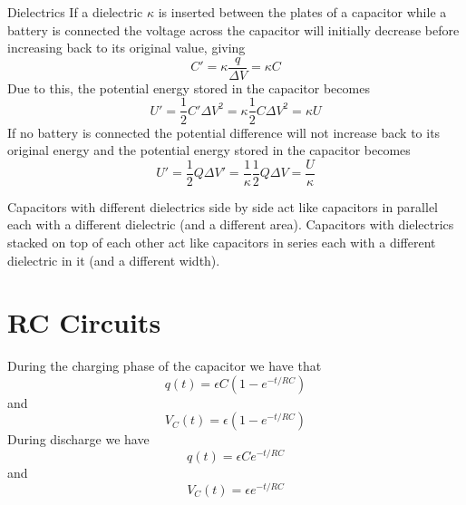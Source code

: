 \documentclass[12pt]{report}
\begin{document}
\begin{defn}{Dielectrics}{}
        If a dielectric $\kappa$ is inserted between the plates of a capacitor while a battery is connected the voltage across the capacitor will initially decrease before increasing back to its original value, giving \begin{equation}
                C' = \kappa \frac{q}{\Delta V} = \kappa C
        \end{equation}
        Due to this, the potential energy stored in the capacitor becomes \begin{equation}
                U' = \frac{1}{2}C'\Delta V^2 = \kappa \frac{1}{2}C\Delta V^2 = \kappa U
        \end{equation}
        If no battery is connected the potential difference will not increase back to its original energy and the potential energy stored in the capacitor becomes \begin{equation}
                U' = \frac{1}{2}Q\Delta V' = \frac{1}{\kappa} \frac{1}{2}Q\Delta V = \frac{U}{\kappa}
        \end{equation}
\end{defn}


\begin{rmk}{}{}
        Capacitors with different dielectrics side by side act like capacitors in parallel each with a different dielectric (and a different area). Capacitors with dielectrics stacked on top of each other act like capacitors in series each with a different dielectric in it (and a different width).
\end{rmk}


\section{RC Circuits}


\begin{defn}{}{}
        During the charging phase of the capacitor we have that \begin{equation}
                q(t) = \epsilon C\left(1-e^{-t/RC}\right)
        \end{equation}
        and \begin{equation}
                V_C(t) = \epsilon\left(1-e^{-t/RC}\right)
        \end{equation}
        During discharge we have \begin{equation}
                q(t) =\epsilon C e^{-t/RC}
        \end{equation}
        and \begin{equation}
                V_C(t) = \epsilon e^{-t/RC}
        \end{equation}
\end{defn}
\end{document}
